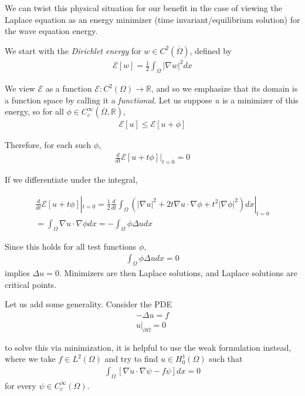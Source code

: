 \documentclass{article}
\newcommand{\R}{{\mathbb{R}}}
\newcommand{\cl}[1]{{\overline{#1}}}
\newcommand{\pd}{\partial}
\begin{document}
	We can twist this physical situation for our benefit in the case of viewing the Laplace equation as an energy minimizer (time invariant/equilibrium solution) for the wave equation energy. 
	
	We start with the \textit{Dirichlet energy} for $w \in C^{2}(\cl{\Omega})$, defined by 
	\begin{align*}
		\mathcal{E}[w] = \frac{1}{2} \int_{\Omega} |\nabla w|^{2} dx
	\end{align*} 
	
	We view $\mathcal{E}$ as a function $\mathcal{E}:C^{2}(\Omega) \to \R$, and so we emphasize that its domain is a function space by calling it a \textit{functional}. Let us suppose $u$ is a minimizer of this energy, so for all $\phi \in C_{c}^{\infty}(\cl{\Omega},\R)$, 
	\begin{align*}
		\mathcal{E}[u] \leq \mathcal{E}[u + \phi]
	\end{align*} 
	
	Therefore, for each such $\phi$,
	\begin{align*}
		\frac{d}{dt} \mathcal{E}[u+t \phi]|_{t=0} = 0
	\end{align*}
	
	If we differentiate under the integral,
	
	\begin{align*}
		\frac{d}{dt} \mathcal{E}[u+t \phi]|_{t=0} = \frac{1}{2} \frac{d}{dt} \int_{\Omega} (|\nabla u |^{2} + 2t\nabla u \cdot \nabla \phi + t^{2} |\nabla \phi|^{2})dx|_{t=0}\\
		= \int_{\Omega} \nabla u \cdot \nabla \phi dx = -\int_{\Omega} \phi \Delta u dx
	\end{align*}
	
	Since this holds for all test functions $\phi$, 
	\begin{align*}
		\int_{\Omega} \phi \Delta u dx =0
	\end{align*}
	implies $\Delta u=0$. Minimizers are then Laplace solutions, and Laplace solutions are critical points. 
	
	Let us add some generality. Consider the PDE
	\begin{align*}
		-\Delta u = f \\
		u|_{\pd \Omega} = 0
	\end{align*}
	
	to solve this via minimization, it is helpful to use the weak formulation instead, where we take $f \in L^{2}(\Omega)$ and try to find $u \in H^{1}_{0}(\Omega)$ such that 
	\begin{align*}
		\int_{\Omega} \left[ \nabla u \cdot \nabla \psi - f \psi \right] dx = 0
	\end{align*}
	for every $\psi \in C_{c}^{\infty}(\Omega)$. 
	
\end{document}

